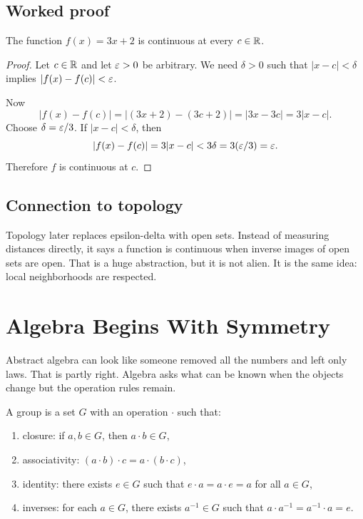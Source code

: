 \documentclass[11pt]{article}
\begin{document}
\subsection{Worked proof}

\begin{theorem}
The function $f(x)=3x+2$ is continuous at every $c\in\mathbb{R}$.
\end{theorem}

\begin{proof}
Let $c\in\mathbb{R}$ and let $\varepsilon>0$ be arbitrary. We need $\delta>0$ such that $|x-c|<\delta$ implies $|f(x)-f(c)|<\varepsilon$.

Now
\[
|f(x)-f(c)|=|(3x+2)-(3c+2)|=|3x-3c|=3|x-c|.
\]
Choose $\delta=\varepsilon/3$. If $|x-c|<\delta$, then
\[
|f(x)-f(c)|=3|x-c|<3\delta=3(\varepsilon/3)=\varepsilon.
\]
Therefore $f$ is continuous at $c$.
\end{proof}

\subsection{Connection to topology}

Topology later replaces epsilon-delta with open sets. Instead of measuring distances directly, it says a function is continuous when inverse images of open sets are open. That is a huge abstraction, but it is not alien. It is the same idea: local neighborhoods are respected.

\newpage
\section{Algebra Begins With Symmetry}

Abstract algebra can look like someone removed all the numbers and left only laws. That is partly right. Algebra asks what can be known when the objects change but the operation rules remain.

\begin{definition}
A group is a set $G$ with an operation $\cdot$ such that:
\begin{enumerate}
\item closure: if $a,b\in G$, then $a\cdot b\in G$,
\item associativity: $(a\cdot b)\cdot c=a\cdot(b\cdot c)$,
\item identity: there exists $e\in G$ such that $e\cdot a=a\cdot e=a$ for all $a\in G$,
\item inverses: for each $a\in G$, there exists $a^{-1}\in G$ such that $a\cdot a^{-1}=a^{-1}\cdot a=e$.
\end{enumerate}
\end{definition}
\end{document}
